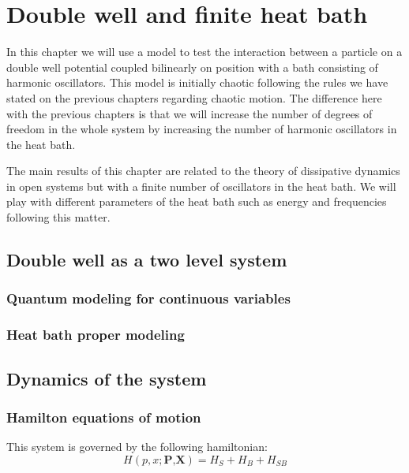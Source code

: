 \pagestyle{fancy}
\fancyhf{}
\rhead{\rightmark}
\lhead{\thepage}

\chapter{Double well and finite heat bath}

In this chapter we will use a model to test the interaction between a particle on a double well potential coupled bilinearly on position with a bath consisting of harmonic oscillators. This model is initially chaotic following the rules we have stated on the previous chapters regarding chaotic motion. The difference here with the previous chapters is that we will increase the number of degrees of freedom in the whole system by increasing the number of harmonic oscillators in the heat bath.\par 

The main results of this chapter are related to the theory of  dissipative dynamics in open systems but with a finite number of oscillators in the heat bath. We will play with different parameters of the heat bath such as energy and frequencies following this matter.\par 

\section{Double well as a two level system}


\subsection{Quantum modeling for continuous variables}

\subsection{Heat bath proper modeling}

\section{Dynamics of the system}


\subsection{Hamilton equations of motion}
This system is governed by the following hamiltonian:
\begin{equation}
H(p,x;\textbf{P,X})=H_{S}+H_B+H_{SB}
\end{equation}

